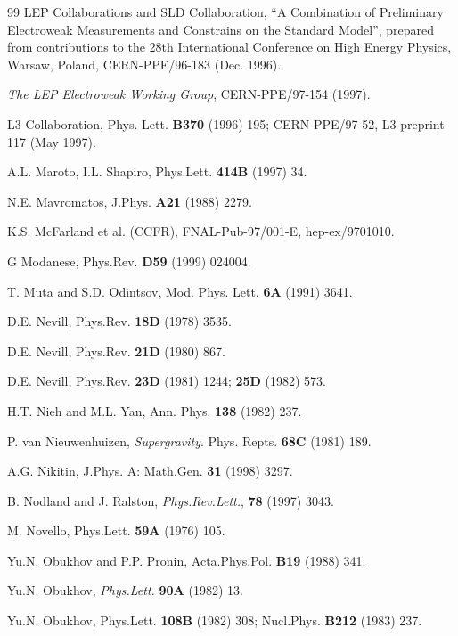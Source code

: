 \begin{thebibliography}{99}
LEP Collaborations and SLD Collaboration, 
``A Combination of
Preliminary Electroweak Measurements and Constrains on
the Standard Model'',
prepared from contributions to the 28th International Conference on High
Energy Physics, Warsaw,  Poland, CERN-PPE/96-183 (Dec. 1996).

{\it The LEP Electroweak Working Group}, CERN-PPE/97-154 (1997).

L3 Collaboration, Phys. Lett. {\bf B370} (1996) 195;
CERN-PPE/97-52, L3 preprint 117 (May 1997).

A.L. Maroto, I.L. Shapiro, Phys.Lett. {\bf 414B} (1997) 34.

 N.E. Mavromatos, J.Phys. {\bf A21} (1988) 2279.

K.S. McFarland et al. (CCFR), FNAL-Pub-97/001-E, hep-ex/9701010.

 G Modanese, Phys.Rev. {\bf D59} (1999) 024004.

T. Muta and S.D. Odintsov, Mod. Phys. Lett. {\bf 6A} (1991) 3641.

 D.E. Nevill, Phys.Rev. {\bf 18D} (1978) 3535.

D.E. Nevill, Phys.Rev. {\bf 21D} (1980) 867.

  D.E. Nevill, Phys.Rev. {\bf 23D} (1981) 1244;
{\bf 25D} (1982) 573.

H.T. Nieh and M.L. Yan, Ann. Phys.
{\bf 138} (1982) 237.

 P. van Nieuwenhuizen, {\sl Supergravity}. 
Phys. Repts. {\bf 68C} (1981) 189. 

A.G. Nikitin, J.Phys. A: Math.Gen. {\bf 31} (1998) 3297.

 B. Nodland and J. Ralston, {\sl Phys.Rev.Lett.},
{\bf 78} (1997) 3043.

 M. Novello, Phys.Lett. {\bf 59A} (1976) 105.

Yu.N. Obukhov and P.P. Pronin, Acta.Phys.Pol. 
{\large\bf B19} (1988) 341.

Yu.N. Obukhov, {\sl Phys.Lett.} {\bf 90A} (1982) 13.

Yu.N. Obukhov, Phys.Lett. {\bf 108B} (1982) 308;
Nucl.Phys. {\bf B212} (1983) 237.


\end{thebibliography}
